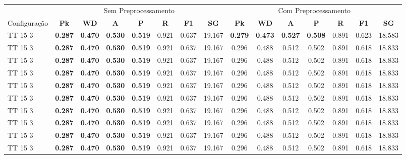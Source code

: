 \documentclass{article}
\begin{document}
 
\begin{longtable}[c]{|l|c|c|c|c|c|c|c||c|c|c|c|c|c|c|} 
\hline 
&\multicolumn{7}{c||}{Sem Preprocessamento} & \multicolumn{7}{c|}{Com Preprocessamento}\\ 
Configuração & \textbf{Pk} & \textbf{WD} & \textbf{A } & \textbf{P } & \textbf{R } & \textbf{F1} & \textbf{SG} & \textbf{Pk} & \textbf{WD} & \textbf{A } & \textbf{P } & \textbf{R } & \textbf{F1} & \textbf{SG}\\ \hline
TT 15  3 & \textbf{0.287} & \textbf{0.470} & \textbf{0.530} & \textbf{0.519} & 0.921 & 0.637 & 19.167 & \textbf{0.279} & \textbf{0.473} & \textbf{0.527} & \textbf{0.508} & 0.891 & 0.623 & 18.583\\ \hline
TT 15  3 & \textbf{0.287} & \textbf{0.470} & \textbf{0.530} & \textbf{0.519} & 0.921 & 0.637 & 19.167 & 0.296 & 0.488 & 0.512 & 0.502 & 0.891 & 0.618 & 18.833\\ \hline
TT 15  3 & \textbf{0.287} & \textbf{0.470} & \textbf{0.530} & \textbf{0.519} & 0.921 & 0.637 & 19.167 & 0.296 & 0.488 & 0.512 & 0.502 & 0.891 & 0.618 & 18.833\\ \hline
TT 15  3 & \textbf{0.287} & \textbf{0.470} & \textbf{0.530} & \textbf{0.519} & 0.921 & 0.637 & 19.167 & 0.296 & 0.488 & 0.512 & 0.502 & 0.891 & 0.618 & 18.833\\ \hline
TT 15  3 & \textbf{0.287} & \textbf{0.470} & \textbf{0.530} & \textbf{0.519} & 0.921 & 0.637 & 19.167 & 0.296 & 0.488 & 0.512 & 0.502 & 0.891 & 0.618 & 18.833\\ \hline
TT 15  3 & \textbf{0.287} & \textbf{0.470} & \textbf{0.530} & \textbf{0.519} & 0.921 & 0.637 & 19.167 & 0.296 & 0.488 & 0.512 & 0.502 & 0.891 & 0.618 & 18.833\\ \hline
TT 15  3 & \textbf{0.287} & \textbf{0.470} & \textbf{0.530} & \textbf{0.519} & 0.921 & 0.637 & 19.167 & 0.296 & 0.488 & 0.512 & 0.502 & 0.891 & 0.618 & 18.833\\ \hline
TT 15  3 & \textbf{0.287} & \textbf{0.470} & \textbf{0.530} & \textbf{0.519} & 0.921 & 0.637 & 19.167 & 0.296 & 0.488 & 0.512 & 0.502 & 0.891 & 0.618 & 18.833\\ \hline
TT 15  3 & \textbf{0.287} & \textbf{0.470} & \textbf{0.530} & \textbf{0.519} & 0.921 & 0.637 & 19.167 & 0.296 & 0.488 & 0.512 & 0.502 & 0.891 & 0.618 & 18.833\\ \hline
TT 15  3 & \textbf{0.287} & \textbf{0.470} & \textbf{0.530} & \textbf{0.519} & 0.921 & 0.637 & 19.167 & 0.296 & 0.488 & 0.512 & 0.502 & 0.891 & 0.618 & 18.833\\ \hline

\end{longtable}
\end{document}
